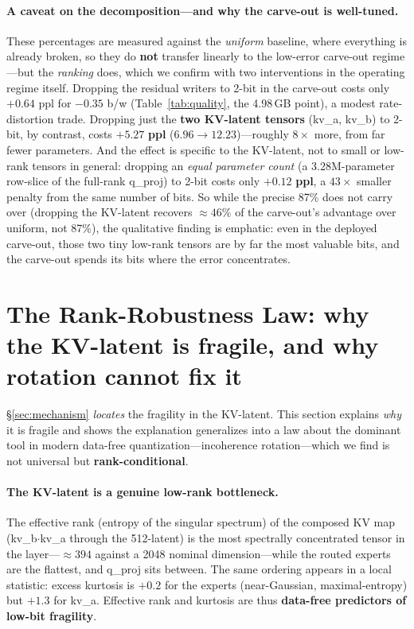 \documentclass[10pt]{article}
\begin{document}
\paragraph{A caveat on the decomposition---and why the carve-out is well-tuned.}
These percentages are measured against the \emph{uniform} baseline, where everything is already broken, so
they do \textbf{not} transfer linearly to the low-error carve-out regime---but the \emph{ranking} does,
which we confirm with two interventions in the operating regime itself. Dropping the residual writers to
2-bit in the carve-out costs only $+0.64$ ppl for $-0.35$ b/w (Table~\ref{tab:quality}, the 4.98\,GB
point), a modest rate-distortion trade. Dropping just the \textbf{two KV-latent tensors} (kv\_a, kv\_b) to
2-bit, by contrast, costs $\mathbf{+5.27}$ \textbf{ppl} ($6.96\to12.23$)---roughly $8\times$ more, from far
fewer parameters. And the effect is specific to the KV-latent, not to small or low-rank tensors in
general: dropping an \emph{equal parameter count} (a 3.28M-parameter row-slice of the full-rank q\_proj)
to 2-bit costs only $\mathbf{+0.12}$ \textbf{ppl}, a $43\times$ smaller penalty from the same number of
bits. So while the precise 87\% does not carry over (dropping the KV-latent recovers
${\approx}46\%$ of the carve-out's advantage over uniform, not 87\%), the qualitative finding is emphatic:
even in the deployed carve-out, those two tiny low-rank tensors are by far the most valuable bits, and the
carve-out spends its bits where the error concentrates.

\section{The Rank-Robustness Law: why the KV-latent is fragile, and why rotation cannot fix it}\label{sec:law}
\S\ref{sec:mechanism} \emph{locates} the fragility in the KV-latent. This section explains \emph{why} it is
fragile and shows the explanation generalizes into a law about the dominant tool in modern data-free
quantization---incoherence rotation---which we find is not universal but \textbf{rank-conditional}.

\paragraph{The KV-latent is a genuine low-rank bottleneck.}
The effective rank (entropy of the singular spectrum) of the composed KV map (kv\_b$\cdot$kv\_a through the
512-latent) is the most spectrally concentrated tensor in the layer---${\approx}394$ against a 2048 nominal
dimension---while the routed experts are the flattest, and q\_proj sits between. The same ordering appears
in a local statistic: excess kurtosis is $+0.2$ for the experts (near-Gaussian, maximal-entropy) but $+1.3$
for kv\_a. Effective rank and kurtosis are thus \textbf{data-free predictors of low-bit fragility}.
\end{document}
